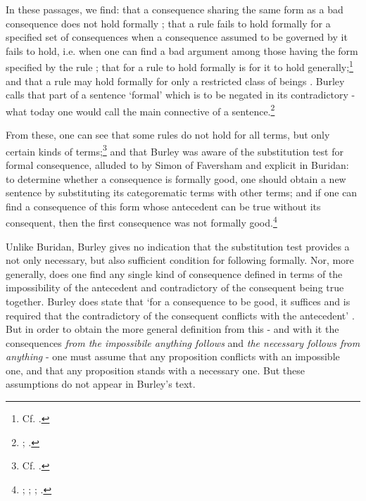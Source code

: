 \documentclass[]{article}
\begin{document}
In these passages, we find: that a consequence sharing the same form as a bad consequence does not hold formally \cite[p. 25.21]{BurleyDPAL}; that a rule fails to hold formally for a specified set of consequences when a consequence assumed to be governed by it fails to hold, i.e. when one can find a bad argument among those having the form specified by the rule \cite[p. 130, par. 75]{Green-Pedersen1980b}; that for a rule to hold formally is for it to hold generally;\footnote{Cf. \cite[p. 130, par. 75, 76]{Green-Pedersen1980b}.} and that a rule may hold formally for only a restricted class of beings \cite[p. 157-158, par. 159]{Green-Pedersen1980b}. Burley calls that part of a sentence `formal' which is to be negated in its contradictory - what today one would call the main connective of a sentence.\footnote{\cite[pp. 73.29; 208.12-30]{BurleyDPAL}; \cite[p. 120, par. 40]{Green-Pedersen1980b}.} 

From these, one can see that some rules do not hold for all terms, but only certain kinds of terms;\footnote{Cf. \cite[p. 214.14-21]{BurleyDPAL}.} and that Burley was aware of the substitution test for formal consequence, alluded to by Simon of Faversham and explicit in Buridan: to determine whether a consequence is formally good, one should obtain a new sentence by substituting its categorematic terms with other terms; and if one can find a consequence of this form whose antecedent can be true without its consequent, then the first consequence was not formally good.\footnote{\cite[pp. 162-163, par. 168]{Green-Pedersen1980b}; \cite[p. 150.32-35]{BurleyDPAL}; \cite[qq. 36-37]{FavershamQE}; \cite[I. 4]{BuridanTC}.} 

Unlike Buridan, Burley gives no indication that the substitution test provides a not only necessary, but also sufficient condition for following formally. Nor, more generally, does one find any single kind of consequence defined in terms of the impossibility of the antecedent and contradictory of the consequent being true together. Burley does state that `for a consequence to be good, it suffices and is required that the contradictory of the consequent conflicts with the antecedent' \cite[p. 64.12-14]{BurleyDPAL}. But in order to obtain the more general definition from this - and with it the consequences \textit{from the impossibile anything follows} and \textit{the necessary follows from anything} - one must assume that any proposition conflicts with an impossible one, and that any proposition stands with a necessary one. But these assumptions do not appear in Burley's text.
\end{document}
